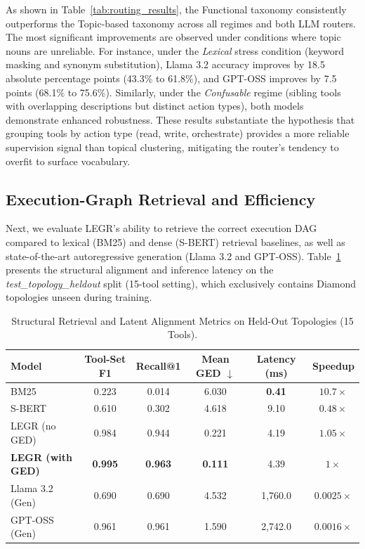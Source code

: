 \documentclass{article}
\begin{document}
As shown in Table~\ref{tab:routing_results}, the Functional taxonomy consistently outperforms the Topic-based taxonomy across all regimes and both LLM routers. The most significant improvements are observed under conditions where topic nouns are unreliable. For instance, under the \textit{Lexical} stress condition (keyword masking and synonym substitution), Llama 3.2 accuracy improves by 18.5 absolute percentage points (43.3\% to 61.8\%), and GPT-OSS improves by 7.5 points (68.1\% to 75.6\%). Similarly, under the \textit{Confusable} regime (sibling tools with overlapping descriptions but distinct action types), both models demonstrate enhanced robustness. These results substantiate the hypothesis that grouping tools by action type (read, write, orchestrate) provides a more reliable supervision signal than topical clustering, mitigating the router's tendency to overfit to surface vocabulary.

\subsection{Execution-Graph Retrieval and Efficiency}
Next, we evaluate LEGR's ability to retrieve the correct execution DAG compared to lexical (BM25) and dense (S-BERT) retrieval baselines, as well as state-of-the-art autoregressive generation (Llama 3.2 and GPT-OSS). Table~\ref{tab:retrieval_metrics} presents the structural alignment and inference latency on the \textit{test\_topology\_heldout} split (15-tool setting), which exclusively contains Diamond topologies unseen during training.

\begin{table}[h]
\caption{Structural Retrieval and Latent Alignment Metrics on Held-Out Topologies (15 Tools).}
\label{tab:retrieval_metrics}
\centering
\small
\begin{tabular}{@{}lccccc@{}}
\toprule
\textbf{Model} & \textbf{Tool-Set F1} & \textbf{Recall@1} & \textbf{Mean GED $\downarrow$} & \textbf{Latency (ms)} & \textbf{Speedup} \\
\midrule
BM25             & 0.223 & 0.014 & 6.030 & \textbf{0.41} & $10.7\times$ \\
S-BERT           & 0.610 & 0.302 & 4.618 & 9.10 & $0.48\times$ \\
\midrule
LEGR (no GED)    & 0.984 & 0.944 & 0.221 & 4.19 & $1.05\times$ \\
\textbf{LEGR (with GED)} & \textbf{0.995} & \textbf{0.963} & \textbf{0.111} & 4.39 & $1\times$ \\
\midrule
Llama 3.2 (Gen)  & 0.690 & 0.690 & 4.532 & 1,760.0 & $0.0025\times$ \\
GPT-OSS (Gen)    & 0.961 & 0.961 & 1.590 & 2,742.0 & $0.0016\times$ \\
\bottomrule
\end{tabular}
\end{table}
\end{document}
